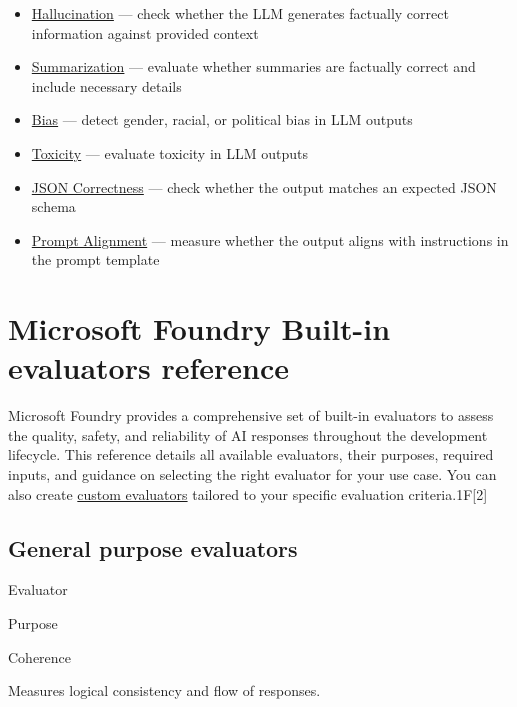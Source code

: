 \documentclass[
  letterpaper,
  DIV=11,
  numbers=noendperiod,
  oneside]{scrreprt}
\begin{document}
\begin{tcolorbox}
\begin{itemize}
\item
  \href{https://deepeval.com/docs/metrics-hallucination}{Hallucination}
  --- check whether the LLM generates factually correct information
  against provided context
\item
  \href{https://deepeval.com/docs/metrics-summarization}{Summarization}
  --- evaluate whether summaries are factually correct and include
  necessary details
\item
  \href{https://deepeval.com/docs/metrics-bias}{Bias} --- detect gender,
  racial, or political bias in LLM outputs
\item
  \href{https://deepeval.com/docs/metrics-toxicity}{Toxicity} ---
  evaluate toxicity in LLM outputs
\item
  \href{https://deepeval.com/docs/metrics-json-correctness}{JSON
  Correctness} --- check whether the output matches an expected JSON
  schema
\item
  \href{https://deepeval.com/docs/metrics-prompt-alignment}{Prompt
  Alignment} --- measure whether the output aligns with instructions in
  the prompt template
\end{itemize}

\chapter{Microsoft Foundry Built-in evaluators
reference}\label{microsoft-foundry-built-in-evaluators-reference}

Microsoft Foundry provides a comprehensive set of built-in evaluators to
assess the quality, safety, and reliability of AI responses throughout
the development lifecycle. This reference details all available
evaluators, their purposes, required inputs, and guidance on selecting
the right evaluator for your use case. You can also create
\href{https://learn.microsoft.com/en-us/azure/foundry/concepts/evaluation-evaluators/custom-evaluators}{custom
evaluators} tailored to your specific evaluation criteria.1F{[}2{]}

\section{General purpose evaluators}\label{general-purpose-evaluators}

Evaluator

Purpose

Coherence

Measures logical consistency and flow of responses.


\end{tcolorbox}
\end{document}
